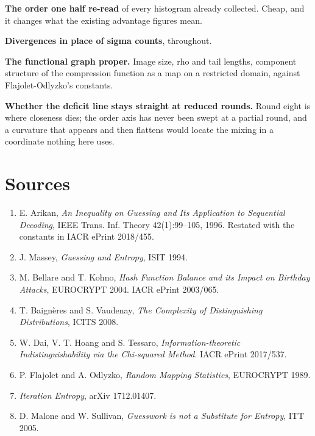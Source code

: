 \textbf{The order one half re-read} of every histogram already collected. Cheap, and it changes what the existing advantage figures mean.

\textbf{Divergences in place of sigma counts}, throughout.

\textbf{The functional graph proper.} Image size, rho and tail lengths, component structure of the compression function as a map on a restricted domain, against Flajolet-Odlyzko's constants.

\textbf{Whether the deficit line stays straight at reduced rounds.} Round eight is where closeness dies; the order axis has never been swept at a partial round, and a curvature that appears and then flattens would locate the mixing in a coordinate nothing here uses.

\section{Sources}

\begin{enumerate}
  \item E. Arikan, \emph{An Inequality on Guessing and Its Application to Sequential Decoding}, IEEE Trans. Inf. Theory 42(1):99--105, 1996. Restated with the constants in IACR ePrint 2018/455.
  \item J. Massey, \emph{Guessing and Entropy}, ISIT 1994.
  \item M. Bellare and T. Kohno, \emph{Hash Function Balance and its Impact on Birthday Attacks}, EUROCRYPT 2004. IACR ePrint 2003/065.
  \item T. Baignères and S. Vaudenay, \emph{The Complexity of Distinguishing Distributions}, ICITS 2008.
  \item W. Dai, V. T. Hoang and S. Tessaro, \emph{Information-theoretic Indistinguishability via the Chi-squared Method}. IACR ePrint 2017/537.
  \item P. Flajolet and A. Odlyzko, \emph{Random Mapping Statistics}, EUROCRYPT 1989.
  \item \emph{Iteration Entropy}, arXiv 1712.01407.
  \item D. Malone and W. Sullivan, \emph{Guesswork is not a Substitute for Entropy}, ITT 2005.
\end{enumerate}
